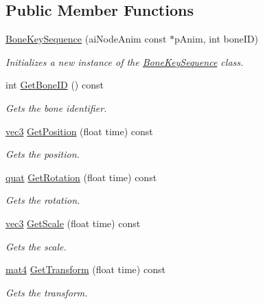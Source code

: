 \subsection*{Public Member Functions}
\begin{DoxyCompactItemize}
\item 
\hyperlink{class_bone_key_sequence_ad186adb564fba0e3d87286c3f78f3ec2}{Bone\+Key\+Sequence} (ai\+Node\+Anim const $\ast$p\+Anim, int bone\+ID)
\begin{DoxyCompactList}\small\item\em Initializes a new instance of the \hyperlink{class_bone_key_sequence}{Bone\+Key\+Sequence} class. \end{DoxyCompactList}\item 
int \hyperlink{class_bone_key_sequence_ac43149e05d6f297d215a4166fcd6f909}{Get\+Bone\+ID} () const 
\begin{DoxyCompactList}\small\item\em Gets the bone identifier. \end{DoxyCompactList}\item 
\hyperlink{_types_8h_a3d0ce73e3199de81565fb01632415288}{vec3} \hyperlink{class_bone_key_sequence_a88b854b70d320cf1f08ae38ea156f3e1}{Get\+Position} (float time) const 
\begin{DoxyCompactList}\small\item\em Gets the position. \end{DoxyCompactList}\item 
\hyperlink{_types_8h_a02abcac728eae225e929e9e0dc427f28}{quat} \hyperlink{class_bone_key_sequence_aae8845be8d37c41e0e61bc27d07354f2}{Get\+Rotation} (float time) const 
\begin{DoxyCompactList}\small\item\em Gets the rotation. \end{DoxyCompactList}\item 
\hyperlink{_types_8h_a3d0ce73e3199de81565fb01632415288}{vec3} \hyperlink{class_bone_key_sequence_a54a036ab5a976bb00d3c470281ab65f1}{Get\+Scale} (float time) const 
\begin{DoxyCompactList}\small\item\em Gets the scale. \end{DoxyCompactList}\item 
\hyperlink{_types_8h_a2db59f395fe82a7394c6324956c265d8}{mat4} \hyperlink{class_bone_key_sequence_acec08fe52251082ea3d224189f7cf201}{Get\+Transform} (float time) const 
\begin{DoxyCompactList}\small\item\em Gets the transform. \end{DoxyCompactList}\end{DoxyCompactItemize}
